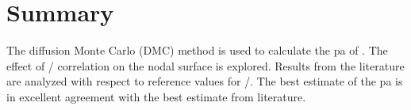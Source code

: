 \section{Summary}
The diffusion Monte Carlo (DMC) method is used to calculate the \gls{pa} of .
The effect of / correlation on the nodal surface is explored.
Results from the literature are analyzed with respect to reference values for /.
The best estimate of the \gls{pa} is in excellent agreement with the best estimate from literature.
